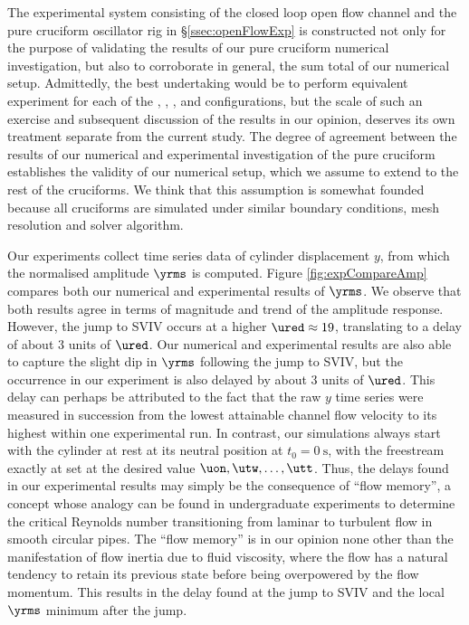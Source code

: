 \documentclass[a4paper,fleqn]{cas-sc}
\begin{document}
The experimental system consisting of the closed loop open flow channel and the pure cruciform oscillator rig in \S\ref{ssec:openFlowExp} is constructed not only for the purpose of validating the results of our pure cruciform numerical investigation, but also to corroborate in general, the sum total of our numerical setup. Admittedly, the best undertaking would be to perform equivalent experiment for each of the \angfi{}, \angfo{}, \angth{}, \angtw{} and \angon{} configurations, but the scale of such an exercise and subsequent discussion of the results in our opinion, deserves its own treatment separate from the current study. The degree of agreement between the results of our numerical and experimental investigation of the pure cruciform establishes the validity of our numerical setup, which we assume to extend to the rest of the cruciforms. We think that this assumption is somewhat founded because all cruciforms are simulated under similar boundary conditions, mesh resolution and solver algorithm.

Our experiments collect time series data of cylinder displacement $y$, from which the normalised \rms{} amplitude $\yrms$ is computed. Figure \ref{fig:expCompareAmp} compares both our numerical and experimental results of $\yrms$. We observe that both results agree in terms of magnitude and trend of the amplitude response. However, the jump to SVIV occurs at a higher $\ured \approx 19$, translating to a delay of about 3 units of $\ured$. Our numerical and experimental results are also able to capture the slight dip in $\yrms$ following the jump to SVIV, but the occurrence in our experiment is also delayed by about 3 units of $\ured$. This delay can perhaps be attributed to the fact that the raw $y$ time series were measured in succession from the lowest attainable channel flow velocity \uth{} to its highest \uel{} within one experimental run. In contrast, our simulations always start with the cylinder at rest at its neutral position at $t_{0} = \SI{0}{\second}$, with the freestream exactly at set at the desired value $\uon, \utw, \dots, \utt$. Thus, the delays found in our experimental results may simply be the consequence of ``flow memory'', a concept whose analogy can be found in undergraduate experiments to determine the critical Reynolds number transitioning from laminar to turbulent flow in smooth circular pipes. The ``flow memory'' is in our opinion none other than the manifestation of flow inertia due to fluid viscosity, where the flow has a natural tendency to retain its previous state before being overpowered by the flow momentum. This results in the delay found at the jump to SVIV and the local $\yrms$ minimum after the jump.
\end{document}
